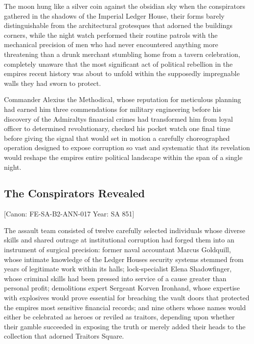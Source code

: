 The moon hung like a silver coin against the obsidian sky when the
conspirators gathered in the shadows of the Imperial Ledger House, their
forms barely distinguishable from the architectural grotesques that
adorned the building\textquotesingle s corners, while the night watch
performed their routine patrols with the mechanical precision of men who
had never encountered anything more threatening than a drunk merchant
stumbling home from a tavern celebration, completely unaware that the
most significant act of political rebellion in the
empire\textquotesingle s recent history was about to unfold within the
supposedly impregnable walls they had sworn to protect.

Commander Alexius the Methodical, whose reputation for meticulous
planning had earned him three commendations for military engineering
before his discovery of the Admiralty\textquotesingle s financial crimes
had transformed him from loyal officer to determined revolutionary,
checked his pocket watch one final time before giving the signal that
would set in motion a carefully choreographed operation designed to
expose corruption so vast and systematic that its revelation would
reshape the empire\textquotesingle s entire political landscape within
the span of a single night.

\subsection{The Conspirators Revealed}\label{the-conspirators-revealed}

{[}Canon: FE-SA-B2-ANN-017 \textbar{} Year: SA 851{]}

The assault team consisted of twelve carefully selected individuals
whose diverse skills and shared outrage at institutional corruption had
forged them into an instrument of surgical precision: former naval
accountant Marcus Goldquill, whose intimate knowledge of the Ledger
House\textquotesingle s security systems stemmed from years of
legitimate work within its halls; lock-specialist Elena Shadowfinger,
whose criminal skills had been pressed into service of a cause greater
than personal profit; demolitions expert Sergeant Korven Ironhand, whose
expertise with explosives would prove essential for breaching the vault
doors that protected the empire\textquotesingle s most sensitive
financial records; and nine others whose names would either be
celebrated as heroes or reviled as traitors, depending upon whether
their gamble succeeded in exposing the truth or merely added their heads
to the collection that adorned Traitor\textquotesingle s Square.

